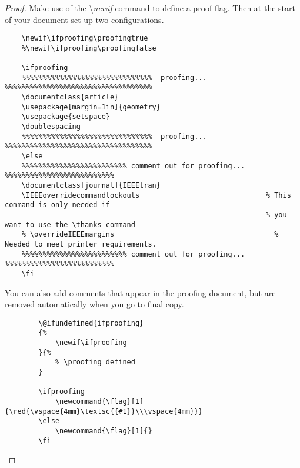 \documentclass{article}
\begin{document}
\begin{proof}

    Make use of the \textbackslash \textit{newif} command to define a proof flag. Then at the start of your document set up two configurations.
    \begin{lstlisting}
    \newif\ifproofing\proofingtrue
    %\newif\ifproofing\proofingfalse
    
    \ifproofing
    %%%%%%%%%%%%%%%%%%%%%%%%%%%%%%%  proofing... %%%%%%%%%%%%%%%%%%%%%%%%%%%%%%%%%%%
    \documentclass{article}
    \usepackage[margin=1in]{geometry}
    \usepackage{setspace}
    \doublespacing
    %%%%%%%%%%%%%%%%%%%%%%%%%%%%%%%  proofing... %%%%%%%%%%%%%%%%%%%%%%%%%%%%%%%%%%%
    \else
    %%%%%%%%%%%%%%%%%%%%%%%%% comment out for proofing... %%%%%%%%%%%%%%%%%%%%%%%%%%
    \documentclass[journal]{IEEEtran}
    \IEEEoverridecommandlockouts                              % This command is only needed if 
                                                              % you want to use the \thanks command
    % \overrideIEEEmargins                                      % Needed to meet printer requirements.
    %%%%%%%%%%%%%%%%%%%%%%%%% comment out for proofing... %%%%%%%%%%%%%%%%%%%%%%%%%%
    \fi
    \end{lstlisting}

    \newpage
    You can also add comments that appear in the proofing document, but are removed automatically when you go to final copy.  

    \begin{lstlisting}
        \@ifundefined{ifproofing} 
        {%
            \newif\ifproofing
        }{%
            % \proofing defined
        }  
        
        \ifproofing
            \newcommand{\flag}[1]{\red{\vspace{4mm}\textsc{{#1}}\\\vspace{4mm}}}
        \else
            \newcommand{\flag}[1]{}
        \fi 
    \end{lstlisting}

    \end{proof}


\newpage


\end{document}
